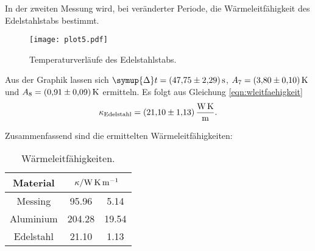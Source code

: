 %
In der zweiten Messung wird, bei veränderter Periode, die Wärmeleitfähigkeit
des Edelstahlstabs bestimmt.
%
\begin{figure}
    \centering
    \texttt{[image: plot5.pdf]}
    \caption{Temperaturverläufe des Edelstahlstabs.}
    \label{fig:plot5}
\end{figure}
%
Aus der Graphik lassen sich \mbox{$\symup{\Delta} t = \SI{47.75\pm2.29}{\second}$}, \mbox{$A_7 = \SI{3.80\pm0.10}{\kelvin}$}
und \mbox{$A_8 = \SI{0.91\pm0.09}{\kelvin}$} ermitteln.
Es folgt aus Gleichung \eqref{eqn:wleitfaehigkeit}
\begin{equation*}
  \kappa_\text{Edelstahl} =\SI{21.10\pm 1.13}{\watt\per\meter\kelvin} .
\end{equation*}

Zusammenfassend sind die ermittelten Wärmeleitfähigkeiten:
\begin{table}[H]
    \centering
    \caption{Wärmeleitfähigkeiten.}
    \label{tab:t2}
    \begin{tabular}{c S @{${}\pm{}$} S[table-format=2.2]}
        \toprule
        {Material}  &  \\
        \midrule
        Messing     & 95.96     & 5.14 \\
        Aluminium   & 204.28    & 19.54\\
        Edelstahl   & 21.10     & 1.13 \\
        \bottomrule
    \end{tabular}
\end{table}
